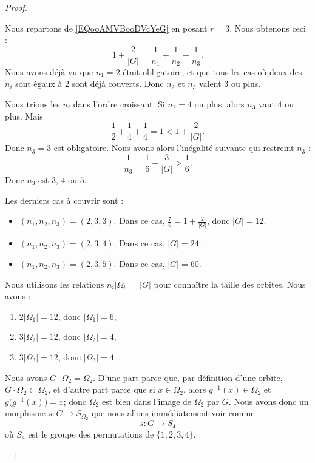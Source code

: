 \begin{proof}
\begin{subproof}
		\spitem[Si \( r=3\), les autres cas possibles]
		Nous repartons de \eqref{EQooAMVBooDVcYeG} en posant \( r=3\). Nous obtenons ceci :
		\begin{equation}
			1+\frac{ 2 }{ | G | }=\frac{1}{ n_1 }+\frac{1}{ n_2 }+\frac{1}{ n_3 }.
		\end{equation}
		Nous avons déjà vu que \( n_1=2\) était obligatoire, et que tous les cas où deux des \( n_i\) sont égaux à \( 2\) sont déjà couverts. Donc \( n_2\) et \( n_3\) valent \( 3\) ou plus.

		Nous trions les \( n_i\) dans l'ordre croissant. Si \( n_2=4\) ou plus, alors \( n_3\) vaut \( 4\) ou plus. Mais
		\begin{equation}
			\frac{ 1 }{2}+\frac{1}{ 4 }+\frac{1}{ 4 }=1<1+\frac{ 2 }{ | G | }.
		\end{equation}
		Donc \( n_3=3\) est obligatoire. Nous avons alors l'inégalité suivante qui restreint \( n_3\) :
		\begin{equation}
			\frac{1}{ n_3 }=\frac{1}{ 6 }+\frac{ 3 }{ | G | }>\frac{1}{ 6 }.
		\end{equation}
		Donc \( n_3\) est \( 3\), \( 4\) ou \( 5\).

		Les derniers cas à couvrir sont :
		\begin{itemize}
			\item \( (n_1,n_2,n_3)=(2,3,3)\). Dans ce cas, \( \frac{ 7 }{ 6 }=1+\frac{ 2 }{ | G | }\), donc \( | G |=12\).
			\item \( (n_1,n_2,n_3)=(2,3,4)\). Dans ce cas, \( | G |=24\).
			\item \( (n_1,n_2,n_3)=(2,3,5)\). Dans ce cas, \( | G |=60\).
		\end{itemize}

		\spitem[Le cas \( (2,3,3)\)]

		Nous utilisons les relations \( n_i| \Omega_i |=| G |\) pour connaître la taille des orbites. Nous avons :
		\begin{enumerate}
			\item
			      \( 2| \Omega_1 |=12\), donc \( | \Omega_1 |=6\),
			\item
			      \( 3| \Omega_2 |=12\), donc \( | \Omega_2 |=4\),
			\item
			      \( 3| \Omega_3 |=12\), donc \( | \Omega_3 |=4\).
		\end{enumerate}

		Nous avons \( G\cdot \Omega_2=\Omega_2\). D'une part parce que, par définition d'une orbite, \( G\cdot\Omega_2\subset\Omega_2\), et d'autre part parce que si \( x\in\Omega_2\), alors \( g^{-1}(x)\in\Omega_2\) et \( g\big( g^{-1}(x) \big)=x\); donc \( \Omega_2\) est bien dans l'image de \( \Omega_2\) par \( G\). Nous avons donc un morphisme \( s\colon G\to S_{\Omega_2}\) que nous allons immédiatement voir comme
		\begin{equation}
			s\colon G\to S_4
		\end{equation}
		où \( S_4\) est le groupe des permutations de \( \{ 1,2,3,4 \}\).


\end{subproof}
\end{proof}
